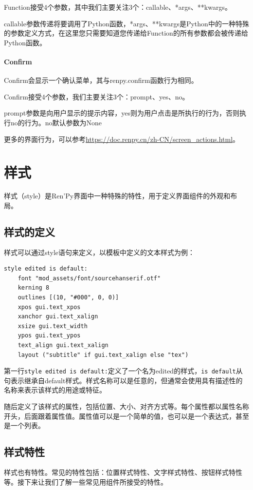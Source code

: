 \documentclass[../../Main.tex]{subfiles}
\begin{document}
Function接受4个参数，其中我们主要关注3个：callable、*args、**kwargs。

callable参数传递将要调用了Python函数，*args、**kwargs是Python中的一种特殊的参数定义方式，在这里您只需要知道您传递给Function的所有参数都会被传递给Python函数。

\paragraph{Confirm}
Confirm会显示一个确认菜单，其与renpy.confirm函数行为相同。

Confirm接受4个参数，我们主要关注3个：prompt、yes、no。

prompt参数是向用户显示的提示内容，yes则为用户点击是所执行的行为，否则执行no的行为。no默认参数为None

更多的界面行为，可以参考\url{https://doc.renpy.cn/zh-CN/screen_actions.html}。

\section{样式}
样式（style）是Ren'Py界面中一种特殊的特性，用于定义界面组件的外观和布局。
\subsection{样式的定义}
样式可以通过style语句来定义，以模板中定义的文本样式为例：
\begin{lstlisting}
style edited is default:
    font "mod_assets/font/sourcehanserif.otf"
    kerning 8
    outlines [(10, "#000", 0, 0)]
    xpos gui.text_xpos
    xanchor gui.text_xalign
    xsize gui.text_width
    ypos gui.text_ypos
    text_align gui.text_xalign
    layout ("subtitle" if gui.text_xalign else "tex")
\end{lstlisting}

第一行\verb|style edited is default:|定义了一个名为edited的样式，\verb|is default|从句表示继承自default样式。样式名称可以是任意的，但通常会使用具有描述性的名称来表示该样式的用途或特征。

随后定义了该样式的属性，包括位置、大小、对齐方式等。每个属性都以属性名称开头，后面跟着属性值。属性值可以是一个简单的值，也可以是一个表达式，甚至是一个列表。

\subsection{样式特性}
样式也有特性。常见的特性包括：位置样式特性、文字样式特性、按钮样式特性等。接下来让我们了解一些常见用组件所接受的特性。
\end{document}

